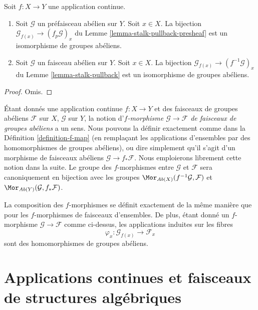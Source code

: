 \begin{lemma}
\label{lemma-pullback-abelian-stalk}
Soit $f : X \to Y$ une application continue.
\begin{enumerate}
\item Soit $\mathcal{G}$ un préfaisceau abélien sur $Y$.
Soit $x \in X$. La bijection
$\mathcal{G}_{f(x)} \to (f_p\mathcal{G})_x$ du
Lemme \ref{lemma-stalk-pullback-presheaf} est un isomorphisme de groupes abéliens.
\item Soit $\mathcal{G}$ un faisceau abélien sur $Y$.
Soit $x \in X$. La bijection
$\mathcal{G}_{f(x)} \to (f^{-1}\mathcal{G})_x$ du
Lemme \ref{lemma-stalk-pullback} est un isomorphisme de groupes abéliens.
\end{enumerate}
\end{lemma}

\begin{proof}
Omis.
\end{proof}

\noindent
Étant donnés une application continue $f : X \to Y$ et des faisceaux de groupes
abéliens $\mathcal{F}$ sur $X$, $\mathcal{G}$ sur $Y$, la notion
d'{\it $f$-morphisme $\mathcal{G} \to \mathcal{F}$
de faisceaux de groupes abéliens} a un sens. Nous pouvons la définir
exactement comme dans la Définition \ref{definition-f-map} (en remplaçant les applications
d'ensembles par des homomorphismes de groupes abéliens), ou
dire simplement qu'il s'agit d'un morphisme de faisceaux abéliens
$\mathcal{G} \to f_*\mathcal{F}$. Nous emploierons librement cette
notion dans la suite. Le groupe des $f$-morphismes entre
$\mathcal{G}$ et $\mathcal{F}$ sera canoniquement en bijection
avec les groupes
$\Mor_{\textit{Ab}(X)}(f^{-1}\mathcal{G}, \mathcal{F})$
et
$\Mor_{\textit{Ab}(Y)}(\mathcal{G}, f_*\mathcal{F})$.

\medskip\noindent
La composition des $f$-morphismes se définit exactement de la
même manière que pour les $f$-morphismes de faisceaux
d'ensembles. De plus, étant donné un $f$-morphisme $\mathcal{G} \to \mathcal{F}$
comme ci-dessus, les applications induites sur les fibres
$$
\varphi_x : \mathcal{G}_{f(x)} \longrightarrow \mathcal{F}_x
$$
sont des homomorphismes de groupes abéliens.


\section{Applications continues et faisceaux de structures algébriques}
\label{section-presheaves-structures-functorial}

